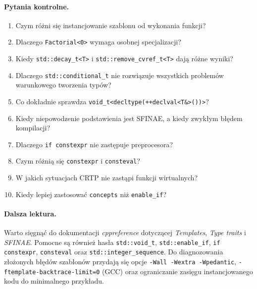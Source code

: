 \paragraph{Pytania kontrolne.}
\begin{enumerate}
\item Czym różni się instancjowanie szablonu od wykonania funkcji?
\item Dlaczego \texttt{Factorial<0>} wymaga osobnej specjalizacji?
\item Kiedy \texttt{std::decay\_t<T>} i \texttt{std::remove\_cvref\_t<T>}
      dają różne wyniki?
\item Dlaczego \texttt{std::conditional\_t} nie rozwiązuje wszystkich
      problemów warunkowego tworzenia typów?
\item Co dokładnie sprawdza \texttt{void\_t<decltype(++declval<T\&>())>}?
\item Kiedy niepowodzenie podstawienia jest SFINAE, a kiedy zwykłym
      błędem kompilacji?
\item Dlaczego \texttt{if constexpr} nie zastępuje preprocesora?
\item Czym różnią się \texttt{constexpr} i \texttt{consteval}?
\item W jakich sytuacjach CRTP nie zastąpi funkcji wirtualnych?
\item Kiedy lepiej zastosować \texttt{concepts} niż \texttt{enable\_if}?
\end{enumerate}

\paragraph{Dalsza lektura.}
Warto sięgnąć do dokumentacji \emph{cppreference} dotyczącej
\emph{Templates}, \emph{Type traits} i \emph{SFINAE}.
Pomocne są również hasła \texttt{std::void\_t}, \texttt{std::enable\_if},
\texttt{if constexpr}, \texttt{consteval} oraz
\texttt{std::integer\_sequence}. Do diagnozowania złożonych
błędów szablonów przydają się opcje \texttt{-Wall -Wextra -Wpedantic},
\texttt{-ftemplate-backtrace-limit=0} (GCC) oraz ograniczanie zasięgu
instancjowanego kodu do minimalnego przykładu.
